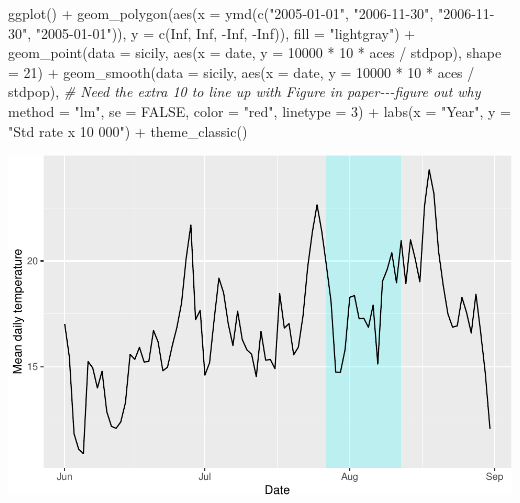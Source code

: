 \documentclass[
]{book}
\newenvironment{Shaded}{\begin{snugshade}}{\end{snugshade}}
\newcommand{\AttributeTok}[1]{\textcolor[rgb]{0.77,0.63,0.00}{#1}}
\newcommand{\CommentTok}[1]{\textcolor[rgb]{0.56,0.35,0.01}{\textit{#1}}}
\newcommand{\ConstantTok}[1]{\textcolor[rgb]{0.00,0.00,0.00}{#1}}
\newcommand{\DecValTok}[1]{\textcolor[rgb]{0.00,0.00,0.81}{#1}}
\newcommand{\FunctionTok}[1]{\textcolor[rgb]{0.00,0.00,0.00}{#1}}
\newcommand{\NormalTok}[1]{#1}
\newcommand{\SpecialCharTok}[1]{\textcolor[rgb]{0.00,0.00,0.00}{#1}}
\newcommand{\StringTok}[1]{\textcolor[rgb]{0.31,0.60,0.02}{#1}}
\begin{document}
\begin{Shaded}
\begin{Highlighting}[]
\FunctionTok{ggplot}\NormalTok{() }\SpecialCharTok{+} 
  \FunctionTok{geom\_polygon}\NormalTok{(}\FunctionTok{aes}\NormalTok{(}\AttributeTok{x =} \FunctionTok{ymd}\NormalTok{(}\FunctionTok{c}\NormalTok{(}\StringTok{"2005{-}01{-}01"}\NormalTok{, }\StringTok{"2006{-}11{-}30"}\NormalTok{, }
                         \StringTok{"2006{-}11{-}30"}\NormalTok{, }\StringTok{"2005{-}01{-}01"}\NormalTok{)), }
               \AttributeTok{y =} \FunctionTok{c}\NormalTok{(}\ConstantTok{Inf}\NormalTok{, }\ConstantTok{Inf}\NormalTok{, }\SpecialCharTok{{-}}\ConstantTok{Inf}\NormalTok{, }\SpecialCharTok{{-}}\ConstantTok{Inf}\NormalTok{)), }\AttributeTok{fill =} \StringTok{"lightgray"}\NormalTok{) }\SpecialCharTok{+} 
  \FunctionTok{geom\_point}\NormalTok{(}\AttributeTok{data =}\NormalTok{ sicily, }
             \FunctionTok{aes}\NormalTok{(}\AttributeTok{x =}\NormalTok{ date, }\AttributeTok{y =} \DecValTok{10000} \SpecialCharTok{*} \DecValTok{10} \SpecialCharTok{*}\NormalTok{ aces }\SpecialCharTok{/}\NormalTok{ stdpop), }\AttributeTok{shape =} \DecValTok{21}\NormalTok{) }\SpecialCharTok{+} 
  \FunctionTok{geom\_smooth}\NormalTok{(}\AttributeTok{data =}\NormalTok{ sicily, }
              \FunctionTok{aes}\NormalTok{(}\AttributeTok{x =}\NormalTok{ date, }\AttributeTok{y =} \DecValTok{10000} \SpecialCharTok{*} \DecValTok{10} \SpecialCharTok{*}\NormalTok{ aces }\SpecialCharTok{/}\NormalTok{ stdpop), }\CommentTok{\# Need the extra 10 to line up with Figure in paper{-}{-}{-}figure out why}
              \AttributeTok{method =} \StringTok{"lm"}\NormalTok{, }\AttributeTok{se =} \ConstantTok{FALSE}\NormalTok{, }\AttributeTok{color =} \StringTok{"red"}\NormalTok{, }\AttributeTok{linetype =} \DecValTok{3}\NormalTok{) }\SpecialCharTok{+} 
  \FunctionTok{labs}\NormalTok{(}\AttributeTok{x =} \StringTok{"Year"}\NormalTok{, }\AttributeTok{y =} \StringTok{"Std rate x 10 000"}\NormalTok{) }\SpecialCharTok{+} 
  \FunctionTok{theme\_classic}\NormalTok{()}
\end{Highlighting}
\end{Shaded}

\includegraphics{adv_epi_analysis_files/figure-latex/unnamed-chunk-63-1.pdf}
\end{document}
